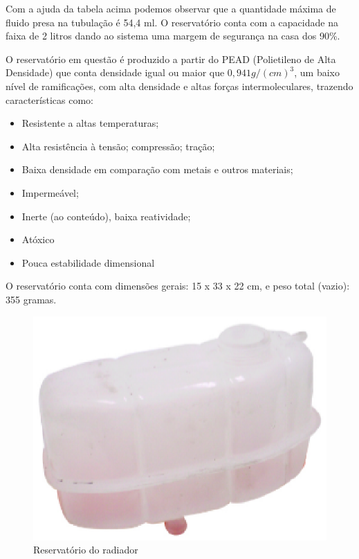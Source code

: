 Com a ajuda da tabela acima podemos observar que a quantidade máxima de fluido presa na tubulação é 54,4 ml. O reservatório conta com a capacidade na faixa de 2 litros dando ao sistema uma margem de segurança na casa dos 90\%. 

O reservatório em questão é produzido a partir do PEAD (Polietileno de Alta Densidade) que conta densidade igual ou maior que $0,941 g/(cm)^3	$, um baixo nível de ramificações, com alta densidade e altas forças intermoleculares, trazendo características como:
\begin{itemize}
\item Resistente a altas temperaturas;
\item Alta resistência à tensão; compressão; tração;
\item Baixa densidade em comparação com metais e outros materiais;
\item Impermeável;
\item Inerte (ao conteúdo), baixa reatividade;
\item Atóxico
\item Pouca estabilidade dimensional 
\end{itemize}
O reservatório conta com dimensões gerais: 15 x 33 x 22 cm, e peso total (vazio): 355 gramas.


\begin{figure}[!htb]                                                               
   \centering                                                                      
   \includegraphics[scale=0.6, keepaspectratio=true]{figuras/reservatorio.eps} 
   \caption{Reservatório do radiador}
\end{figure}

